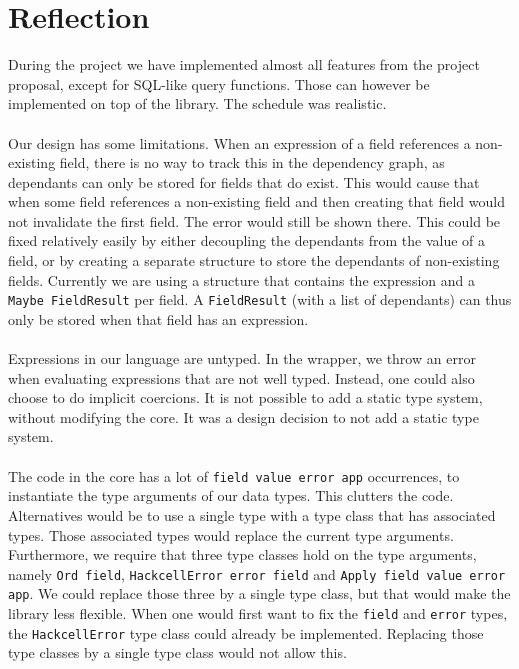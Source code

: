 \documentclass{article}
\begin{document}
	\section{Reflection}
	During the project we have implemented almost all features from the project proposal, except for SQL-like query functions. Those can however be implemented on top of the library. The schedule was realistic.
\\\\	
	Our design has some limitations. When an expression of a field references a non-existing field, there is no way to track this in the dependency graph, as dependants can only be stored for fields that do exist. This would cause that when some field references a non-existing field and then creating that field would not invalidate the first field. The error would still be shown there. This could be fixed relatively easily by either decoupling the dependants from the value of a field, or by creating a separate structure to store the dependants of non-existing fields. Currently we are using a structure that contains the expression and a \texttt{Maybe FieldResult} per field. A \texttt{FieldResult} (with a list of dependants) can thus only be stored when that field has an expression.
\\\\	
	Expressions in our language are untyped. In the wrapper, we throw an error when evaluating expressions that are not well typed. Instead, one could also choose to do implicit coercions. It is not possible to add a static type system, without modifying the core. It was a design decision to not add a static type system.
\\\\
	The code in the core has a lot of \texttt{field value error app} occurrences, to instantiate the type arguments of our data types. This clutters the code. Alternatives would be to use a single type with a type class that has associated types. Those associated types would replace the current type arguments. Furthermore, we require that three type classes hold on the type arguments, namely \texttt{Ord field}, \texttt{HackcellError error field} and \texttt{Apply field value error app}. We could replace those three by a single type class, but that would make the library less flexible. When one would first want to fix the \texttt{field} and \texttt{error} types, the \texttt{HackcellError} type class could already be implemented. Replacing those type classes by a single type class would not allow this.
\\\\
\end{document}
